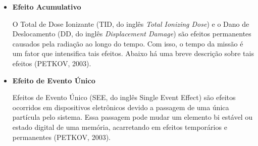 \begin{itemize}
\item \textbf{Efeito Acumulativo}

O Total de Dose Ionizante (TID, do inglês \textit{Total Ionizing Dose}) e o Dano de Deslocamento (DD, do inglês \textit{Displacement Damage}) são efeitos permanentes causados pela radiação ao longo do tempo. Com isso, o tempo da missão é um fator que intensifica tais efeitos. Abaixo há uma breve descrição sobre tais efeitos (PETKOV, 2003).

\begin{table}[h]
\centering
\caption{Efeitos Acumulativos causada pela radiação espacial.}
\label{tabela2}
\end{table}


\item \textbf{ Efeito de Evento Único}

Efeitos de Evento Único (SEE, do inglês Single Event Effect) são efeitos ocorridos em dispositivos eletrônicos devido a passagem de uma única partícula pelo sistema. Essa passagem pode mudar um elemento bi estável ou estado digital de uma memória, acarretando em efeitos temporários e permanentes (PETKOV, 2003).


\end{itemize}
